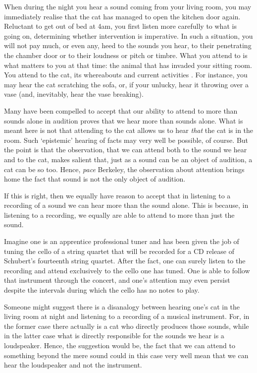 \documentclass[sloppy, journal, git, bytitle, dodraft]{humapap}
\begin{document}
When during the night you hear a sound coming from your living room, you may immediately realise that the cat has managed to open the kitchen door again. Reluctant to get out of bed at 4am, you first listen more carefully to what is going on, determining whether intervention is imperative. In such a situation, you will not pay much, or even any, heed to the sounds you hear, to their penetrating the chamber door or to their loudness or pitch or timbre. What you attend to is what matters to you at that time: the animal that has invaded your sitting room. You attend to the cat, its whereabouts and current activities \autocite[cf.][p. ?]{nudds2013}. For instance, you may hear the cat scratching the sofa, or, if your unlucky, hear it throwing over a vase (and, inevitably, hear the vase breaking).

Many have been compelled to accept that our ability to attend to more than sounds alone in audition proves that we hear more than sounds alone. What is meant here is not that attending to the cat allows us to hear \emph{that} the cat is in the room. Such `epistemic' hearing of facts may very well be possible, of course. But the point is that the observation, that we can attend both to the sound we hear and to the cat, makes salient that, just as a sound can be an object of audition, a cat can be so too. Hence, \emph{pace} Berkeley, the observation about attention brings home the fact that sound is not the only object of audition.  

If this is right, then we equally have reason to accept that in listening to a recording of a sound we can hear more than the sound alone. This is because, in listening to a recording, we equally are able to attend to more than just the sound. 

Imagine one is an apprentice professional tuner and has been given the job of tuning the cello of a string quartet that will be recorded for a CD release of Schubert's fourteenth string quartet. After the fact, one can surely listen to the recording and attend exclusively to the cello one has tuned. One is able to follow that instrument through the concert, and one's attention may even persist despite the intervals during which the cello has no notes to play.

Someone might suggest there is a disanalogy between hearing one's cat in the living room at night and listening to a recording of a musical instrument. For, in the former case there actually is a cat who directly produces those sounds, while in the latter case what is directly responsible for the sounds we hear is a loudspeaker. Hence, the suggestion would be, the fact that we can attend to something beyond the mere sound could in this case very well mean that we can hear the loudspeaker and not the instrument. 
\end{document}
